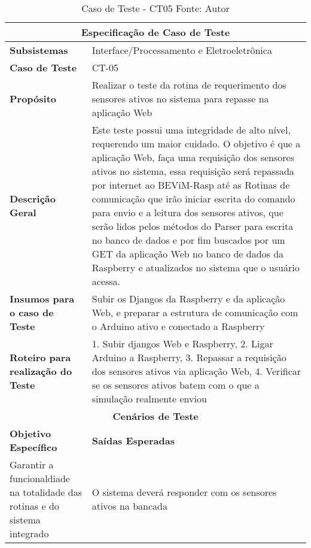 \begin{table}[H]
    \begin{center}
        \begin{tabular}{|p{5cm}|p{12cm}|}
            \hline
            \multicolumn{2}{|c|}{\textbf{Especificação de Caso de Teste}} \\ \hline
                \textbf{Subsistemas}                               & Interface/Processamento e Eletroeletrônica \\ \hline
                \textbf{Caso de Teste}                             & CT-05 \\ \hline
                \textbf{Propósito}                                     & Realizar o teste da rotina de requerimento dos sensores ativos no sistema para repasse na aplicação Web \\ \hline
                \textbf{Descrição Geral}                           & Este teste possui uma integridade de alto nível, requerendo um maior cuidado. O objetivo é que a aplicação Web, faça uma requisição dos sensores ativos no sistema, essa requisição será repassada por internet ao BEViM-Rasp até as Rotinas de comunicação que irão iniciar escrita do comando para envio e a leitura dos sensores ativos, que serão lidos pelos métodos do Parser para escrita no banco de dados e por fim buscados por um GET da aplicação Web no banco de dados da Raspberry e atualizados no sistema que o usuário acessa. \\ \hline
                \textbf{Insumos para o caso de Teste}    & Subir os Djangos da Raspberry e da aplicação Web, e preparar a estrutura de comunicação com o Arduino ativo e conectado a Raspberry \\ \hline
                \textbf{Roteiro para realização do Teste}&  1. Subir djangos Web e Raspberry, 2. Ligar Arduino a Raspberry, 3. Repassar a requisição dos sensores ativos via aplicação Web, 4. Verificar se os sensores ativos batem com o que a simulação realmente enviou \\ \hline
            \multicolumn{2}{|c|}{\textbf{Cenários de Teste}} \\ \hline
                \textbf{Objetivo Específico}                      & \textbf{Saídas Esperadas} \\ \hline
                Garantir a funcionaldiade na totalidade das rotinas e do sistema integrado & O sistema deverá responder com os sensores ativos na bancada\\ \hline
        \end{tabular}
    \end{center}
    \caption[Caso de Teste - CT05]{Caso de Teste - CT05
    \protect Fonte: Autor}
    \label{CT-05}
\end{table}

